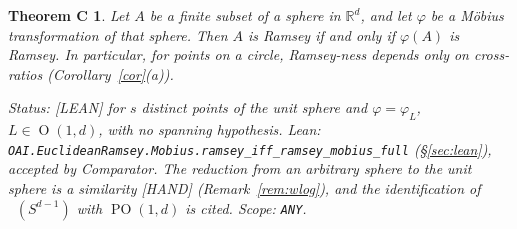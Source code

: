 \documentclass[11pt]{amsart}
\newcommand{\st}[1]{\textsf{[#1]}}
\newcommand{\R}{\mathbb{R}}
\DeclareMathOperator{\PO}{PO}
\DeclareMathOperator{\Ort}{O}
\DeclareMathOperator{\Mob}{M\ddot{o}b}
\newcommand{\LeanThmCFullName}{\texttt{OAI.EuclideanRamsey.Mobius.ramsey\_iff\_ramsey\_mobius\_full}}
\theoremstyle{plain}
\newtheorem*{theoremC}{Theorem C}
\theoremstyle{definition}
\begin{document}
\begin{theoremC}
Let $A$ be a finite subset of a sphere in $\R^d$, and let $\varphi$ be a M\"obius transformation
of that sphere. Then $A$ is Ramsey if and only if $\varphi(A)$ is Ramsey. In particular, for
points on a circle, Ramsey-ness depends only on cross-ratios (Corollary~\ref{cor}(a)).

\smallskip\noindent\emph{Status:} \st{LEAN} for $s$ distinct points of the unit sphere and
$\varphi=\varphi_L$, $L\in\Ort(1,d)$, with no spanning hypothesis. Lean: \LeanThmCFullName{}
(\S\ref{sec:lean}), accepted by Comparator. The reduction from an arbitrary sphere to the unit
sphere is a similarity \st{HAND} (Remark~\ref{rem:wlog}), and the identification of
$\Mob(S^{d-1})$ with $\PO(1,d)$ is cited. Scope: \texttt{ANY}.
\end{theoremC}
\end{document}
